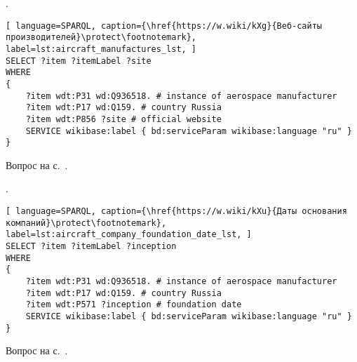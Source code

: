 \begin{task}
    \label{answer:aircraft_manufacturers}
    . 
    
	\begin{lstlisting}[ language=SPARQL, caption={\href{https://w.wiki/kXg}{Веб-сайты производителей}\protect\footnotemark}, label=lst:aircraft_manufactures_lst, ]
SELECT ?item ?itemLabel ?site
WHERE
{
    ?item wdt:P31 wd:Q936518. # instance of aerospace manufacturer
  	?item wdt:P17 wd:Q159. # country Russia
  	?item wdt:P856 ?site # official website
    SERVICE wikibase:label { bd:serviceParam wikibase:language "ru" }
}
\end{lstlisting}
    
    \small{Вопрос на с.~\pageref{lst:lang2}.}
\end{task}

\begin{task}
    \label{answer:aircraft_company_foundation_date}
    . 
    
	\begin{lstlisting}[ language=SPARQL, caption={\href{https://w.wiki/kXu}{Даты основания компаний}\protect\footnotemark}, label=lst:aircraft_company_foundation_date_lst, ]
SELECT ?item ?itemLabel ?inception
WHERE
{
    ?item wdt:P31 wd:Q936518. # instance of aerospace manufacturer
  	?item wdt:P17 wd:Q159. # country Russia
  	?item wdt:P571 ?inception # foundation date
    SERVICE wikibase:label { bd:serviceParam wikibase:language "ru" }
}
\end{lstlisting}
    
    \small{Вопрос на с.~\pageref{aircraft_question_2}.}
\end{task}

